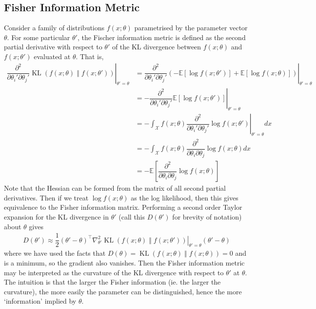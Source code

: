 \documentclass[11pt]{report} %
\begin{document}
\subsection{Fisher Information Metric}

Consider a family of distributions $f\left(x;\theta\right)$ parametrised by the parameter vector $\theta$. For some particular $\theta'$, the Fischer information metric is defined as the second partial derivative with respect to $\theta'$ of the KL divergence between $f\left(x;\theta\right)$ and $f\left(x;\theta'\right)$ evaluated at $\theta$. That is,
\begin{align}
\left.\dfrac{\partial^{2}}{\partial\theta_{i}'\partial\theta_{j}'}\operatorname{KL}\left(f\left(x;\theta\right)\middle\Vert f\left(x;\theta'\right)\right)\right|_{\theta' = \theta} &= \left.\dfrac{\partial^{2}}{\partial\theta_{i}'\partial\theta_{j}'}\left(-\mathbb{E}\left[\log f\left(x;\theta'\right)\right] + \mathbb{E}\left[\log f\left(x;\theta\right)\right]\right)\right|_{\theta' = \theta} \\
&= -\left.\dfrac{\partial^{2}}{\partial\theta_{i}'\partial\theta_{j}'}\mathbb{E}\left[\log f\left(x;\theta'\right)\right]\right|_{\theta' = \theta} \\
&= -\int_{\mathcal{X}}f\left(x;\theta\right)\left.\dfrac{\partial^{2}}{\partial\theta_{i}'\partial\theta_{j}'}\log f\left(x;\theta'\right)\right|_{\theta' = \theta}dx \\
&= -\int_{\mathcal{X}}f\left(x;\theta\right)\dfrac{\partial^{2}}{\partial\theta_{i}\partial\theta_{j}}\log f\left(x;\theta\right)dx \\
&= -\mathbb{E}\left[\dfrac{\partial^{2}}{\partial\theta_{i}\partial\theta_{j}}\log f\left(x;\theta\right)\right]
\end{align}
Note that the Hessian can be formed from the matrix of all second partial derivatives. Then if we treat $\log f\left(x;\theta\right)$ as the log likelihood, then this gives equivalence to the Fisher information matrix. Performing a second order Taylor expansion for the KL divergence in $\theta'$ (call this $D\left(\theta'\right)$ for brevity of notation) about $\theta$ gives
\begin{align}
D\left(\theta'\right) \approx \dfrac{1}{2}\left(\theta' - \theta\right)^{\top}\left.\nabla_{\theta'}^{2}\operatorname{KL}\left(f\left(x;\theta\right)\middle\Vert f\left(x;\theta'\right)\right)\right|_{\theta' = \theta}\left(\theta' - \theta\right)
\end{align}
where we have used the facts that $D\left(\theta\right) = \operatorname{KL}\left(f\left(x;\theta\right)\middle\Vert f\left(x;\theta\right)\right) = 0$ and is a minimum, so the gradient also vanishes. Then the Fisher information metric may be interpreted as the curvature of the KL divergence with respect to $\theta'$ at $\theta$. The intuition is that the larger the Fisher information (ie. the larger the curvature), the more easily the parameter can be distinguished, hence the more `information' implied by $\theta$.
\end{document}
